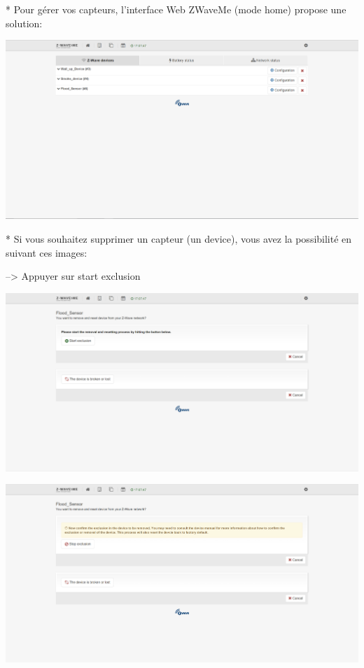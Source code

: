 * Pour gérer vos capteurs, l'interface Web ZWaveMe (mode home) propose une solution:

\includegraphics[scale=0.5]{./Images/png/manage_zwaveme.png}\newline

* Si vous souhaitez supprimer un capteur (un device), vous avez la possibilité en suivant ces images:


--> Appuyer sur start exclusion


\includegraphics[scale=0.5]{./Images/png/delete_zwaveme.png}\newline

\includegraphics[scale=0.5]{./Images/png/exclusion_zwaveme.png}\newline

